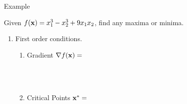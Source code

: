 \documentclass[]{book}
\theoremstyle{definition}
\theoremstyle{definition}
\theoremstyle{definition}
\theoremstyle{remark}
\begin{document}
Example

Given \(f({\bf x})=x_1^3-x_2^3+9x_1x_2\), find any maxima or minima.

\begin{enumerate}
  \item First order conditions.  
    \begin{enumerate}
    \item Gradient $\nabla f({\bf x}) = $
        $$\phantom{\begin{pmatrix} \frac{\partial f}{\partial x_1} \\ 
        \frac{\partial f}{\partial x_2}\end{pmatrix} =
        \begin{pmatrix} 3x_1^2+9x_2 \\ -3x_2^2+9x_1 \end{pmatrix}}$$
    \item Critical Points ${\bf x^*} =$\\
        $$\phantom{3x_1^2 + 9x_2 = 0 \quad \Rightarrow \quad  9x_2 = 
        -3x_1^2 \quad \Rightarrow \quad  x_2 = -\frac{1}{3}x_1^2}$$
        $$\phantom{-3x_2^2 + 9x_1 = 0 \quad \Rightarrow \quad 
        -3(-\frac{1} {3}x_1^2)^2 + 9x_1 = 0}$$ 
        $$\phantom{\Rightarrow \quad -\frac{1}{3}x_1^4 
        + 9x_1 = 0 \quad \Rightarrow \quad x_1^3 = 27x_1 \quad 
        \Rightarrow \quad x_1 = 3}$$
        $$\phantom{3(3)^2 + 9x_2 = 0 \quad \Rightarrow \quad x_2 = -3}$$    
    \end{enumerate}       
 

\end{enumerate}
\end{document}
